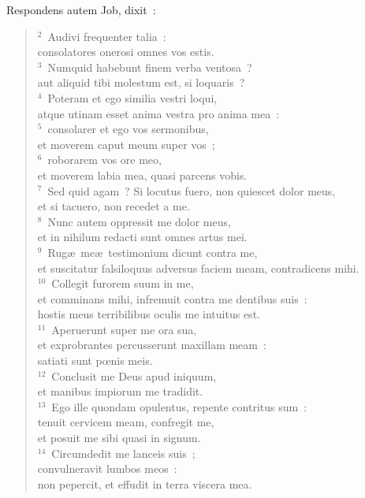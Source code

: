 \lettrine[lines=3,image=true,loversize=0.05,lraise=-0.03]{R}{}espondens autem Job, dixit~:
\begin{flushleft}\begin{verse}\vspace{6pt}${}^{2}$~Audivi frequenter talia~:\\ consolatores onerosi omnes vos estis.\\
${}^{3}$~Numquid habebunt finem verba ventosa~?\\ aut aliquid tibi molestum est, si loquaris~?\\
${}^{4}$~Poteram et ego similia vestri loqui,\\ atque utinam esset anima vestra pro anima mea~:\\
${}^{5}$~consolarer et ego vos sermonibus,\\ et moverem caput meum super vos~;\\
${}^{6}$~roborarem vos ore meo,\\ et moverem labia mea, quasi parcens vobis.\\
${}^{7}$~Sed quid agam~? Si locutus fuero, non quiescet dolor meus,\\ et si tacuero, non recedet a me.\\
${}^{8}$~Nunc autem oppressit me dolor meus,\\ et in nihilum redacti sunt omnes artus mei.\\
${}^{9}$~Rug\ae\ me\ae\ testimonium dicunt contra me,\\ et suscitatur falsiloquus adversus faciem meam, contradicens mihi.\\
${}^{10}$~Collegit furorem suum in me,\\ et comminans mihi, infremuit contra me dentibus suis~:\\ hostis meus terribilibus oculis me intuitus est.\\
${}^{11}$~Aperuerunt super me ora sua,\\ et exprobrantes percusserunt maxillam meam~:\\ satiati sunt pœnis meis.\\
${}^{12}$~Conclusit me Deus apud iniquum,\\ et manibus impiorum me tradidit.\\
${}^{13}$~Ego ille quondam opulentus, repente contritus sum~:\\ tenuit cervicem meam, confregit me,\\ et posuit me sibi quasi in signum.\\
${}^{14}$~Circumdedit me lanceis suis~;\\ convulneravit lumbos meos~:\\ non pepercit, et effudit in terra viscera mea.\\

\end{verse}
\end{flushleft}
